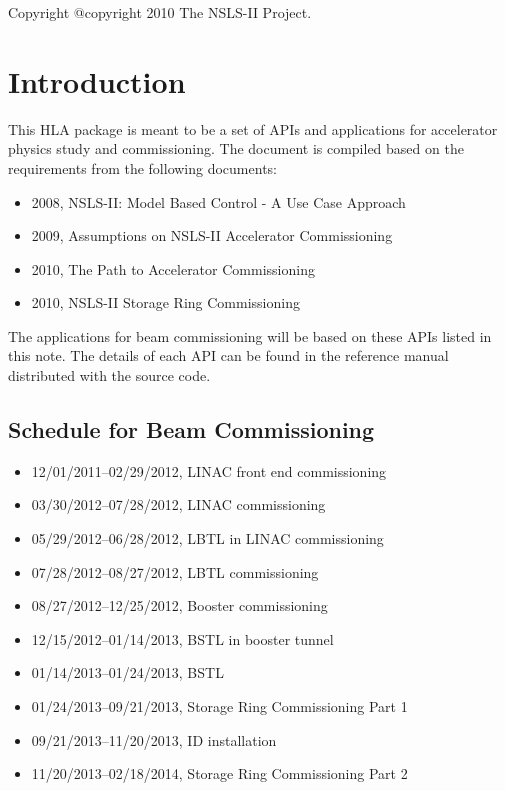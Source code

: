 \documentclass[letterpaper,showtrims]{memoir}
\begin{document}
Copyright @copyright{} 2010 The NSLS-II Project.


\newpage
\setcounter{tocdepth}{3}
\tableofcontents


\chapter{Introduction}


This HLA package is meant to be a set of APIs and applications for
accelerator physics study and commissioning. The document is compiled
based on the requirements from the following documents:
\begin{itemize}
\item 2008, NSLS-II: Model Based Control - A Use Case Approach~\cite{bengtsson_2008_nsls-ii}
\item 2009, Assumptions on NSLS-II Accelerator Commissioning~\cite{willeke_2009_assumptions}
\item 2010, The Path to Accelerator Commissioning~\cite{willeke_2010_path}
\item 2010, NSLS-II Storage Ring Commissioning~\cite{krinsky_2010_nsls-ii}
\end{itemize}
The applications for beam commissioning will be based on these APIs
listed in this note. The details of each API can be found in the
reference manual distributed with the source code.

\section{Schedule for Beam Commissioning}

\vspace{5ex}
\begin{itemize}
\item 12/01/2011--02/29/2012, LINAC front end commissioning
\item 03/30/2012--07/28/2012, LINAC commissioning
\item 05/29/2012--06/28/2012, LBTL in LINAC commissioning
\item 07/28/2012--08/27/2012, LBTL commissioning
\item 08/27/2012--12/25/2012, Booster commissioning
\item 12/15/2012--01/14/2013, BSTL in booster tunnel
\item 01/14/2013--01/24/2013, BSTL
\item 01/24/2013--09/21/2013, Storage Ring Commissioning Part 1
\item 09/21/2013--11/20/2013, ID installation
\item 11/20/2013--02/18/2014, Storage Ring Commissioning Part 2
\end{itemize}
\end{document}
